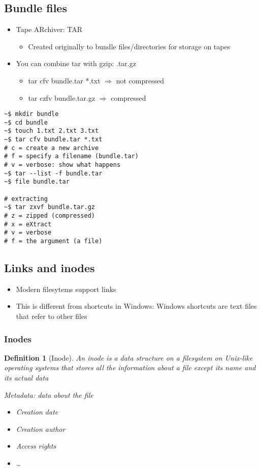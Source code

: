 \documentclass{article}
\newtheorem{theorem}{Definition}[section]
\begin{document}
\subsection{Bundle files}

\begin{itemize}
    \item Tape ARchiver: TAR
    \begin{itemize}
        \item Created originally to bundle files/directories for storage on tapes
    \end{itemize}
    \item You can combine tar with gzip: .tar.gz
    \begin{itemize}
        \item tar cfv bundle.tar *.txt $\Rightarrow$ not compressed
        \item tar czfv bundle.tar.gz $\Rightarrow$ compressed
    \end{itemize}
\end{itemize}

\begin{verbatim}
~$ mkdir bundle
~$ cd bundle
~$ touch 1.txt 2.txt 3.txt
~$ tar cfv bundle.tar *.txt
# c = create a new archive
# f = specify a filename (bundle.tar)
# v = verbose: show what happens
~$ tar --list -f bundle.tar
~$ file bundle.tar

# extracting
~$ tar zxvf bundle.tar.gz
# z = zipped (compressed)
# x = eXtract
# v = verbose
# f = the argument (a file) 
\end{verbatim}

\subsection{Links and inodes}

\begin{itemize}
    \item Modern filesytems support links
    \item This is different from shortcuts in Windows: Windows shortcuts are text files that refer to other files
\end{itemize}

\subsubsection{Inodes}

\begin{theorem}[Inode]
    An inode is a data structure on a filesystem on Unix-like operating systems that 
    stores all the information about a file except its name and its actual data

    Metadata: data about the file
    \begin{itemize}
        \item Creation date
        \item Creation author
        \item Access rights
        \item \dots
    \end{itemize}
\end{theorem}
\end{document}
